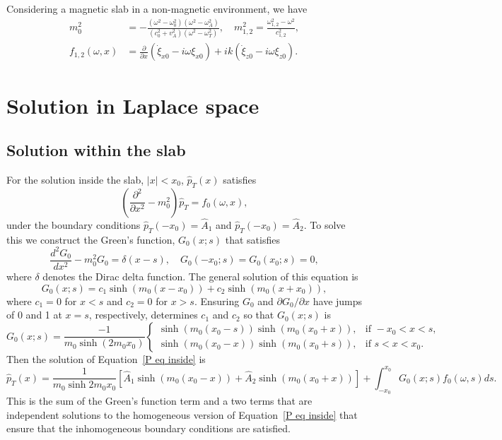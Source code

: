 \documentclass[12pt]{../style-files/ociamthesis}
\begin{document}
Considering a magnetic slab in a non-magnetic environment, we have
\begin{align}
m_0^2 &= - \frac{(\omega^2 - \omega_0^2)(\omega^2 - \omega_A^2)}{(c_0^2 + v_A^2)(\omega^2 - \omega_T^2)}, \quad m_{1,2}^2 = \frac{\omega_{1,2}^2 - \omega^2}{c_{1,2}^2}, \\
f_{1,2}(\omega,x) &= \frac{\partial}{\partial x} (\dot{\xi}_{x0} - i\omega\xi_{x0}) + ik(\dot{\xi}_{z0} - i\omega\xi_{z0}).
\end{align}


\section{Solution in Laplace space}

\subsection{Solution within the slab}
For the solution inside the slab, $|x| < x_0$, $\hat{p}_T(x)$ satisfies
\begin{equation}
\left( \frac{\partial^2}{\partial x^2} - m_0^2 \right) \hat{p}_T = f_0(\omega, x),
\end{equation}
under the boundary conditions $\hat{p}_T(-x_0) = \hat{A}_1$ and $\hat{p}_T(-x_0) = \hat{A}_2$. To solve this we construct the Green's function, $G_0(x;s)$ that satisfies
\begin{equation}
\frac{d^2G_0}{dx^2} - m_0^2 G_0 = \delta(x-s), \quad G_0(-x_0;s) = G_0(x_0;s) = 0,
\end{equation}
where $\delta$ denotes the Dirac delta function. The general solution of this equation is
\begin{equation}
G_0(x;s) = c_1\sinh(m_0(x - x_0)) + c_2\sinh(m_0(x + x_0)),
\end{equation}
where $c_1 = 0$ for $x < s$ and $c_2 = 0$ for $x > s$. Ensuring $G_0$ and $\partial G_0 / \partial x$ have jumps of 0 and 1 at $x = s$, respectively, determines $c_1$ and $c_2$ so that $G_0(x;s)$ is
\begin{equation}
G_0(x;s) = \frac{-1}{m_0\sinh(2m_0 x_0)}
\begin{cases}
\sinh(m_0(x_0 - s))\sinh(m_0(x_0 + x)), & \text{if } -x_0<x<s, \\
\sinh(m_0(x_0 - x))\sinh(m_0(x_0 + s)), & \text{if } s<x<x_0.
\end{cases}
\end{equation}
Then the solution of Equation~\eqref{P eq inside} is
\begin{equation}
\hat{p}_T(x) = \frac{1}{m_0\sinh{2m_0 x_0}} \left[ \hat{A}_1\sinh(m_0(x_0 - x)) + \hat{A}_2\sinh(m_0(x_0 + x)) \right] + \int_{-x_0}^{x_0} G_0(x;s) f_0(\omega, s) ds.
\label{P sol 0}
\end{equation}
This is the sum of the Green's function term and a two terms that are independent solutions to the homogeneous version of Equation~\eqref{P eq inside} that ensure that the inhomogeneous boundary conditions are satisfied.
\end{document}
